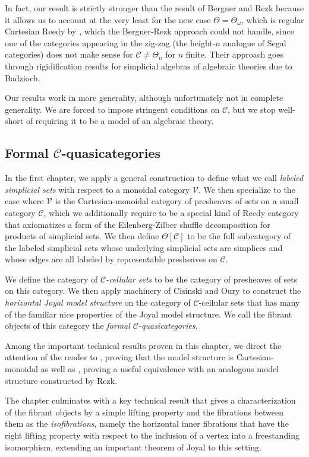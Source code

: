 \documentclass[leqno]{article}
\numberwithin{equation}{subsection}
\theoremstyle{plain}   %
\theoremstyle{remark}
\theoremstyle{plain}
\providecommand{\C}{}
\renewcommand{\C}{\ensuremath{\mathcal{C}}}
\begin{document}
In fact, our result is strictly stronger than the result of Bergner and Rezk because it allows us to account at the very least for the new case \(\Theta=\Theta_\omega\), which is regular Cartesian Reedy by \cite{berger-iterated-wreath}, which the Bergner-Rezk approach could not handle, since one of the categories appearing in the zig-zag (the height-\(n\) analogue of Segal categories) does not make sense for \(\C\neq \Theta_n\) for \(n\) finite. Their approach goes through rigidification results for simplicial algebras of algebraic theories due to Badzioch.

Our results work in more generality, although unfortunately not in complete generality.  We are forced to impose stringent conditions on \(\C\), but we stop well-short of requiring it to be a model of an algebraic theory. 

\subsection*{Formal \(\C\)-quasicategories}
In the first chapter, we apply a general construction to define what we call \emph{labeled simplicial sets} with respect to a monoidal category \(\mathcal{V}\).  We then specialize to the case where \(\mathcal{V}\) is the Cartesian-monoidal category of presheaves of sets on a small category \(\C\), which we additionally require to be a special kind of Reedy category that axiomatizes a form of the Eilenberg-Zilber shuffle decomposition for products of simplicial sets.  We then define \(\Theta[\C]\) to be the full subcategory of the labeled simplicial sets whose underlying simplicial sets are simplices and whose edges are all labeled by representable presheaves on \(\C\).  

We define the category of \emph{\(\C\)-cellular sets} to be the category of presheaves of sets on this category.  We then apply machinery of Cisinski and Oury to construct the \emph{horizontal Joyal model structure} on the category of \(\C\)-cellular sets that has many of the familiar nice properties of the Joyal model structure. We call the fibrant objects of this category the \emph{formal \(\C\)-quasicategories}.

Among the important technical results proven in this chapter, we direct the attention of the reader to , proving that the model structure is Cartesian-monoidal as well as , proving a useful equivalence with an analogous model structure constructed by Rezk.    

The chapter culminates with a key technical result that gives a characterization of the fibrant objects by a simple lifting property and the fibrations between them as the \emph{isofibrations}, namely the horizontal inner fibrations that have the right lifting property with respect to the inclusion of a vertex into a freestanding isomorphism, extending an important  theorem of Joyal to this setting.
\end{document}
